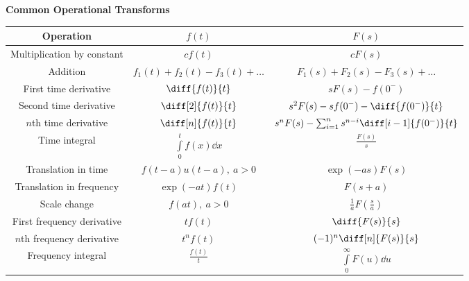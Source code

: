 \documentclass[a4paper,11pt]{article}
\begin{document}
	\textbf{Common Operational Transforms}
	\begin{center}
		\begin{longtable}{|c|c|c|}
			\hline
			Operation & $f(t)$ & $F(s)$ \\ \hline
			Multiplication by constant & $cf(t)$ &  $cF(s)$ \\ \hline
			Addition & $f_1(t) + f_2(t) - f_3(t) + \ldots$ & $F_1(s) + F_2(s) - F_3(s) + \ldots$ \\ \hline
			First time derivative & $\diff{f(t)}{t}$ & $sF(s) - f(0^-)$ \\ \hline 
			Second time derivative & $\diff[2]{f(t)}{t}$ & $s^2F(s) - sf(0^-) - \diff{f(0^-)}{t}$ \\ \hline
			$n$th time derivative & $\diff[n]{f(t)}{t}$ & $s^nF(s) - \sum_{i = 1}^{n}s^{n - i}\diff[i - 1]{f(0^-)}{t}$ \\ \hline
			Time integral & $\int\limits_0^t f(x)\dd x$ & $\frac{F(s)}{s}$ \\ \hline
			Translation in time & $f(t - a)u(t - a),~a > 0$ & $\exp(-as)F(s)$ \\ \hline
			Translation in frequency & $\exp(-at)f(t)$ & $F(s + a)$ \\ \hline
			Scale change & $f(at),~a > 0$ & $\frac{1}{a}F\left(\frac{s}{a}\right)$ \\ \hline
			First frequency derivative & $tf(t)$ & $\diff{F(s)}{s}$ \\ \hline
			$n$th frequency derivative & $t^nf(t)$ & $(-1)^n\diff[n]{F(s)}{s}$ \\ \hline
			Frequency integral & $\frac{f(t)}{t}$ & $\int\limits_{0}^{\infty} F(u)\dd u$ \\ \hline
		\end{longtable}
	\end{center}
	
\end{document}

